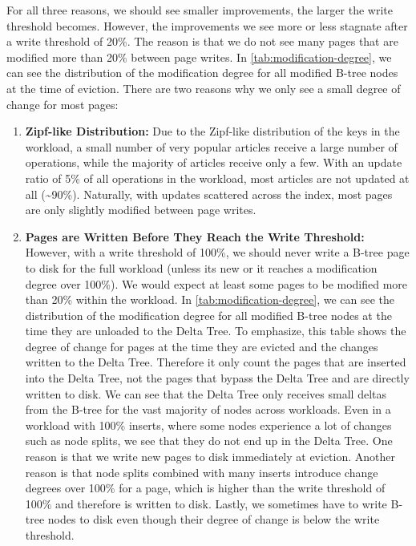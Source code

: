 For all three reasons, we should see smaller improvements, the larger the write threshold becomes.
However, the improvements we see more or less stagnate after a write threshold of 20\%.
The reason is that we do not see many pages that are modified more than 20\% between page writes.
In \autoref{tab:modification-degree}, we can see the distribution of the modification degree for all modified B-tree nodes at the time of eviction.
There are two reasons why we only see a small degree of change for most pages:

\begin{enumerate}
\item \textbf{Zipf-like Distribution:}
Due to the Zipf-like distribution of the keys in the workload, a small number of very popular articles receive a large number of operations, while the majority of articles receive only a few.
With an update ratio of 5\% of all operations in the workload, most articles are not updated at all (\textasciitilde 90\%).
Naturally, with updates scattered across the index, most pages are only slightly modified between page writes.
\item \textbf{Pages are Written Before They Reach the Write Threshold:}
However, with a write threshold of 100\%, we should never write a B-tree page to disk for the full workload (unless its new or it reaches a modification degree over 100\%).
We would expect at least some pages to be modified more than 20\% within the workload.
In \autoref{tab:modification-degree}, we can see the distribution of the modification degree for all modified B-tree nodes at the time they are unloaded to the Delta Tree.
To emphasize, this table shows the degree of change for pages at the time they are evicted and the changes written to the Delta Tree. 
Therefore it only count the pages that are inserted into the Delta Tree, not the pages that bypass the Delta Tree and are directly written to disk.
We can see that the Delta Tree only receives small deltas from the B-tree for the vast majority of nodes across workloads.
Even in a workload with 100\% inserts, where some nodes experience a lot of changes such as node splits, we see that they do not end up in the Delta Tree.
One reason is that we write new pages to disk immediately at eviction.
Another reason is that node splits combined with many inserts introduce change degrees over 100\% for a page, which is higher than the write threshold of 100\% and therefore is written to disk.
Lastly, we sometimes have to write B-tree nodes to disk even though their degree of change is below the write threshold.

\end{enumerate}
